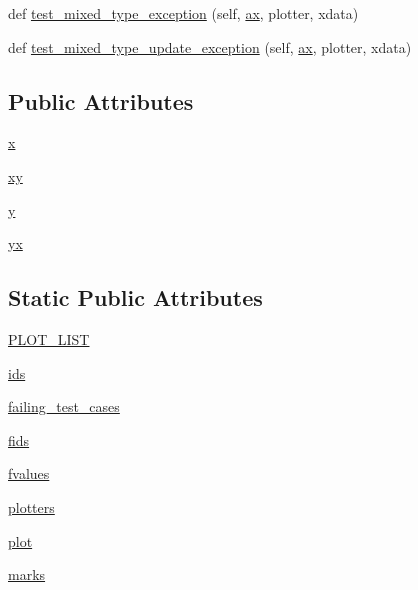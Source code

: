 \begin{DoxyCompactItemize}
\item 
def \hyperlink{classmatplotlib_1_1tests_1_1test__category_1_1TestPlotTypes_a699944a5f28ee1ab93dba32aeb63e15a}{test\+\_\+mixed\+\_\+type\+\_\+exception} (self, \hyperlink{namespacematplotlib_1_1tests_1_1test__category_ac4a78c2ee1d8720275b6d0ca5dee3c1c}{ax}, plotter, xdata)
\item 
def \hyperlink{classmatplotlib_1_1tests_1_1test__category_1_1TestPlotTypes_a30c1a484f47a2eeea1f5dcb88c3e657c}{test\+\_\+mixed\+\_\+type\+\_\+update\+\_\+exception} (self, \hyperlink{namespacematplotlib_1_1tests_1_1test__category_ac4a78c2ee1d8720275b6d0ca5dee3c1c}{ax}, plotter, xdata)
\end{DoxyCompactItemize}
\subsection*{Public Attributes}
\begin{DoxyCompactItemize}
\item 
\hyperlink{classmatplotlib_1_1tests_1_1test__category_1_1TestPlotTypes_a0fbbf46625dee31512f1ad1fa4dc7d89}{x}
\item 
\hyperlink{classmatplotlib_1_1tests_1_1test__category_1_1TestPlotTypes_a781249ada57e3eb7d20f75710d9fd514}{xy}
\item 
\hyperlink{classmatplotlib_1_1tests_1_1test__category_1_1TestPlotTypes_a5b967718d84243e153051a1bb165914b}{y}
\item 
\hyperlink{classmatplotlib_1_1tests_1_1test__category_1_1TestPlotTypes_a1f1b92557b50b0b50b50da1c2f3c750d}{yx}
\end{DoxyCompactItemize}
\subsection*{Static Public Attributes}
\begin{DoxyCompactItemize}
\item 
\hyperlink{classmatplotlib_1_1tests_1_1test__category_1_1TestPlotTypes_a95ea42515a829a578b66ec1451152f70}{P\+L\+O\+T\+\_\+\+L\+I\+ST}
\item 
\hyperlink{classmatplotlib_1_1tests_1_1test__category_1_1TestPlotTypes_ab9321701af32cc9edc5825f84f52cf14}{ids}
\item 
\hyperlink{classmatplotlib_1_1tests_1_1test__category_1_1TestPlotTypes_a2c45b31f6649af7de65d72caf64347c6}{failing\+\_\+test\+\_\+cases}
\item 
\hyperlink{classmatplotlib_1_1tests_1_1test__category_1_1TestPlotTypes_a4b9cd475a1fdb83041d8181f659bdb35}{fids}
\item 
\hyperlink{classmatplotlib_1_1tests_1_1test__category_1_1TestPlotTypes_a80584ab31fe66e53e576eacc513217e0}{fvalues}
\item 
\hyperlink{classmatplotlib_1_1tests_1_1test__category_1_1TestPlotTypes_aaec84700bab708f839c94589e39c22a3}{plotters}
\item 
\hyperlink{classmatplotlib_1_1tests_1_1test__category_1_1TestPlotTypes_a3cecf6a7a643fba9a82c89c42b9442de}{plot}
\item 
\hyperlink{classmatplotlib_1_1tests_1_1test__category_1_1TestPlotTypes_a3e211a55c5b23d5eaf78fbacae0cd8f4}{marks}
\end{DoxyCompactItemize}


